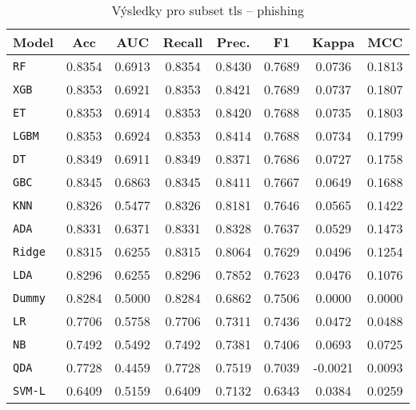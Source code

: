 \begin{table}[H]
  \centering
  \small
  \caption{Výsledky pro subset tls – phishing}
  \begin{tabular}{|l|c|c|c|c|c|c|c|}
    \hline
    \textbf{Model} & \textbf{Acc} & \textbf{AUC} & \textbf{Recall} & \textbf{Prec.} & \textbf{F1} & \textbf{Kappa} & \textbf{MCC} \\
    \hline
    \texttt{RF} & 0.8354 & 0.6913 & 0.8354 & 0.8430 & 0.7689 & 0.0736 & 0.1813 \\
    \texttt{XGB} & 0.8353 & 0.6921 & 0.8353 & 0.8421 & 0.7689 & 0.0737 & 0.1807 \\
    \texttt{ET} & 0.8353 & 0.6914 & 0.8353 & 0.8420 & 0.7688 & 0.0735 & 0.1803 \\
    \texttt{LGBM} & 0.8353 & 0.6924 & 0.8353 & 0.8414 & 0.7688 & 0.0734 & 0.1799 \\
    \texttt{DT} & 0.8349 & 0.6911 & 0.8349 & 0.8371 & 0.7686 & 0.0727 & 0.1758 \\
    \texttt{GBC} & 0.8345 & 0.6863 & 0.8345 & 0.8411 & 0.7667 & 0.0649 & 0.1688 \\
    \texttt{KNN} & 0.8326 & 0.5477 & 0.8326 & 0.8181 & 0.7646 & 0.0565 & 0.1422 \\
    \texttt{ADA} & 0.8331 & 0.6371 & 0.8331 & 0.8328 & 0.7637 & 0.0529 & 0.1473 \\
    \texttt{Ridge} & 0.8315 & 0.6255 & 0.8315 & 0.8064 & 0.7629 & 0.0496 & 0.1254 \\
    \texttt{LDA} & 0.8296 & 0.6255 & 0.8296 & 0.7852 & 0.7623 & 0.0476 & 0.1076 \\
    \texttt{Dummy} & 0.8284 & 0.5000 & 0.8284 & 0.6862 & 0.7506 & 0.0000 & 0.0000 \\
    \texttt{LR} & 0.7706 & 0.5758 & 0.7706 & 0.7311 & 0.7436 & 0.0472 & 0.0488 \\
    \texttt{NB} & 0.7492 & 0.5492 & 0.7492 & 0.7381 & 0.7406 & 0.0693 & 0.0725 \\
    \texttt{QDA} & 0.7728 & 0.4459 & 0.7728 & 0.7519 & 0.7039 & -0.0021 & 0.0093 \\
    \texttt{SVM-L} & 0.6409 & 0.5159 & 0.6409 & 0.7132 & 0.6343 & 0.0384 & 0.0259 \\
    \hline
  \end{tabular}
\end{table}
\vspace{0.5cm}
